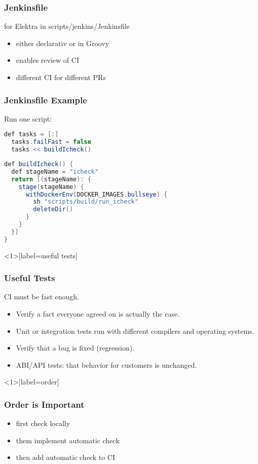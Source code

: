 \begin{frame}
	\frametitle{Jenkinsfile}

	for Elektra in scripts/jenkins/Jenkinsfile

	\begin{itemize}[<+-| alert@+>]

	\item either declarativ or in Groovy
	\item enables review of CI
	\item different CI for different PRs
	\end{itemize}
\end{frame}

\begin{frame}[fragile]
	\frametitle{Jenkinsfile Example}

	Run one script:
	\begin{lstlisting}[language=Java]
  def tasks = [:]
  tasks.failFast = false
  tasks << buildIcheck()
\end{lstlisting}

	\begin{lstlisting}[language=Java]
def buildIcheck() {
  def stageName = "icheck"
  return [(stageName): {
    stage(stageName) {
      withDockerEnv(DOCKER_IMAGES.bullseye) {
        sh "scripts/build/run_icheck"
        deleteDir()
      }
    }
  }]
}
\end{lstlisting}
\end{frame}

\begin{frame}<1>[label=useful tests]
	\frametitle{Useful Tests}

	\begin{problem}
	CI must be fast enough.
	\end{problem}

	\begin{itemize}[<+-| alert@+>]

	\item Verify a fact everyone agreed on is actually the case.
	\item Unit or integration tests run with different compilers and operating systems.
	\item Verify that a bug is fixed (regression).
	\item ABI/API tests: that behavior for customers is unchanged.
	\end{itemize}
\end{frame}

\begin{frame}<1>[label=order]
	\frametitle{Order is Important}

	\begin{itemize}[<+-| alert@+>]

	\item first check locally
	\item them implement automatic check
	\item then add automatic check to CI
	\end{itemize}
\end{frame}

